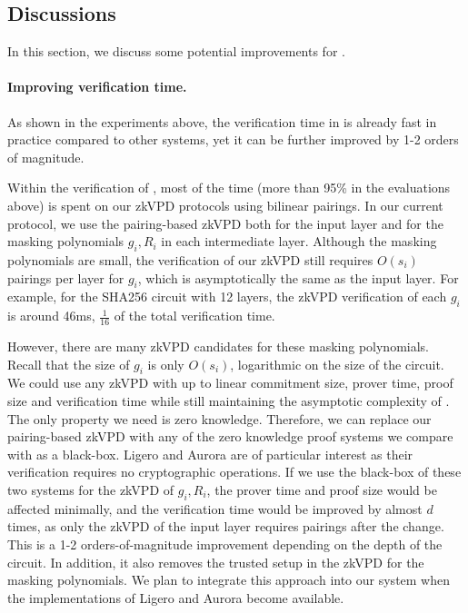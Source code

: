 \subsection{Discussions}\label{subsec::discuss}

In this section, we discuss some potential improvements for \name.


\paragraph{Improving verification time.} As shown in the experiments above, the verification time in \name is already fast in practice compared to other systems, yet it can be further improved by 1-2 orders of magnitude. 

Within the verification of \name, most of the time (more than 95\% in the evaluations above) is spent on our zkVPD protocols using bilinear pairings. In our current protocol, we use the pairing-based zkVPD both for the input layer and for the masking polynomials $g_i, R_i$ in each intermediate layer. Although the masking polynomials are small, the verification of our zkVPD still requires $O(s_i)$ pairings per layer for $g_i$, which is asymptotically the same as the input layer. For example, for the SHA256 circuit with 12 layers, the zkVPD verification of each $g_i$ is around 46ms, $\frac{1}{16}$ of the total verification time.

However, there are many zkVPD candidates for these masking polynomials. Recall that the size of $g_i$ is only $O(s_i)$, logarithmic on the size of the circuit. We could use any zkVPD with up to linear commitment size, prover time, proof size and verification time while still maintaining the asymptotic complexity of \name. The only property we need is zero knowledge. Therefore, we can replace our pairing-based zkVPD with any of the zero knowledge proof systems we compare with as a black-box. Ligero and Aurora are of particular interest as their verification requires no cryptographic operations. If we use the black-box of these two systems for the zkVPD of $g_i, R_i$, the prover time and proof size would be affected minimally, and the verification time would be improved by almost $d$ times, as only the zkVPD of the input layer requires pairings after the change. This is a 1-2 orders-of-magnitude improvement depending on the depth of the circuit. In addition, it also removes the trusted setup in the zkVPD for the masking polynomials. We plan to integrate this approach into our system when the implementations of Ligero and Aurora become available.  


